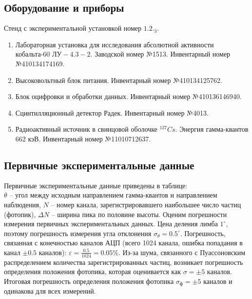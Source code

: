 \documentclass[10pt,a4paper]{article}
\begin{document}
	\subsection*{Оборудование и приборы}
		
	Стенд с экспериментальной установкой номер $1.2._3$.
	\begin{enumerate}
		\item Лабораторная установка для исследования абсолютной активности кобальта-60 $ЛУ-4.3-2$. Заводской номер №1513. Инвентарный номер №410134174169.
				
		\item Высоковольтный блок питания. Инвентарный номер №410134125762.
		
		\item Блок оцифровки и обработки данных. Инвентарный номер №410136146940.
		
		\item Сцинтилляционный детектор Радек. Инвентарный номер №4013.
				
		\item Радиоактивный источник в свинцовой оболочке ${}^{137}Cs$. Энергия гамма-квантов 662 кэВ. Инвентарный номер №11010712637.
	\end{enumerate}
	
	\subsection*{Первичные экспериментальные данные}
	
	Первичные экспериментальные данные приведены в таблице:\\
	
	
	$\theta$ -- угол между исходным направлением гамма-квантов и направлением наблюдения, $N$ -- номер канала, зарегистрировавшего наибольшее число частиц (фотопик), $\Delta N$ -- ширина пика по половине высоты. Оценим погрешности измерения первичных экспериментальных данных. Цена деления лимба $1^\circ$, поэтому погрешность измерения угла отклонения $\sigma_\theta = 0.5^\circ$. Погрешность, связанная с конечностью каналов АЦП (всего 1024 канала, ошибка попадания в канал $\pm 0.5$ каналов): $\varepsilon = \frac{0.5}{1024} = 0.05 \%$. Из-за шума, связанного с Пуассоновским распределением количества зарегистрированных частиц, возникает погрешность определения положения фотопика, которая оценивается как $\sigma = \pm 5$ каналов. Итоговая погрешность определения положения фотопика $\sigma_ф = \pm 5$ каналов и одинакова для всех измерений.
	
\end{document}
